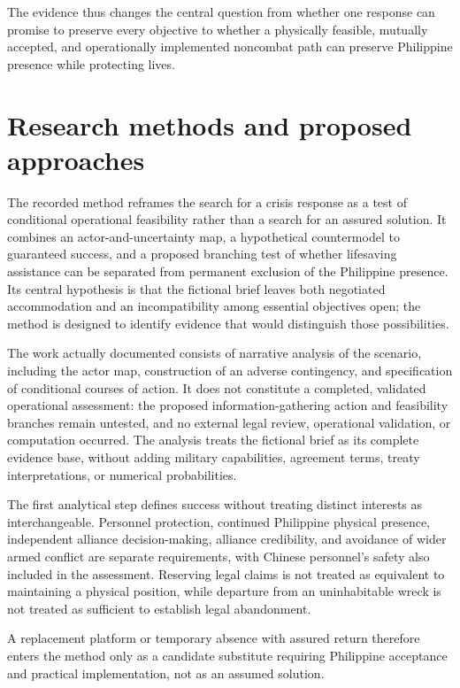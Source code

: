 \documentclass[11pt]{article}
\begin{document}
The evidence thus changes the central question from whether one response can promise to preserve every objective to whether a physically feasible, mutually accepted, and operationally implemented noncombat path can preserve Philippine presence while protecting lives.

\section{Research methods and proposed approaches}
The recorded method reframes the search for a crisis response as a test of conditional operational feasibility rather than a search for an assured solution. It combines an actor-and-uncertainty map, a hypothetical countermodel to guaranteed success, and a proposed branching test of whether lifesaving assistance can be separated from permanent exclusion of the Philippine presence. Its central hypothesis is that the fictional brief leaves both negotiated accommodation and an incompatibility among essential objectives open; the method is designed to identify evidence that would distinguish those possibilities.

The work actually documented consists of narrative analysis of the scenario, including the actor map, construction of an adverse contingency, and specification of conditional courses of action. It does not constitute a completed, validated operational assessment: the proposed information-gathering action and feasibility branches remain untested, and no external legal review, operational validation, or computation occurred. The analysis treats the fictional brief as its complete evidence base, without adding military capabilities, agreement terms, treaty interpretations, or numerical probabilities.

The first analytical step defines success without treating distinct interests as interchangeable. Personnel protection, continued Philippine physical presence, independent alliance decision-making, alliance credibility, and avoidance of wider armed conflict are separate requirements, with Chinese personnel’s safety also included in the assessment. Reserving legal claims is not treated as equivalent to maintaining a physical position, while departure from an uninhabitable wreck is not treated as sufficient to establish legal abandonment.

A replacement platform or temporary absence with assured return therefore enters the method only as a candidate substitute requiring Philippine acceptance and practical implementation, not as an assumed solution.
\end{document}

